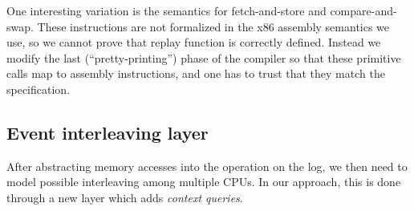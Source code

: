%
%

One interesting variation is the semantics
for fetch-and-store and compare-and-swap. These instructions are not
formalized in the x86 assembly semantics we use, so we cannot prove
that replay function is correctly defined. Instead we modify the last
(``pretty-printing'') phase of the compiler so that these primitive calls map to assembly
instructions, and one has to trust that they match the specification.

\subsection{Event interleaving layer}
\label{chapter:mcslock:subsec:abstractoperationlayer}

After abstracting memory accesses into the operation on the log, we
then need to model possible interleaving among multiple CPUs. In
our approach, this is done through a new layer which adds \emph{context queries}.

